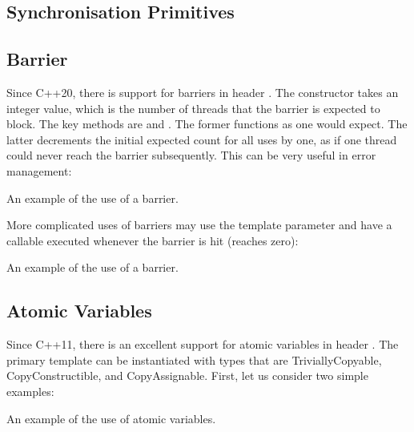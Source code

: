 \begin{itemize}
\begin{end}
\section{Synchronisation Primitives}

\subsection{Barrier}

Since C++20, there is support for barriers in header . The constructor takes an integer value, which is the number of threads that the barrier is expected to block. The key methods are  and . The former functions as one would expect. The latter decrements the initial expected count for all uses by one, as if one thread could never reach the barrier subsequently. This can be very useful in error management:

\raggedbottom
\begin{codebox}[]{\href{https://godbolt.org/z/}{\ExternalLink}}
\footnotesize An example of the use of a barrier.
\tcblower
{}
\end{codebox}

More complicated uses of barriers may use the template parameter  and have a callable executed whenever the barrier is hit (reaches zero):

\raggedbottom
\begin{codebox}[]{\href{https://godbolt.org/z/}{\ExternalLink}}
\footnotesize An example of the use of a barrier.
\tcblower
{}
\end{codebox}

\subsection{Atomic Variables}
\label{sec:atomiccpp23}

Since C++11, there is an excellent support for atomic variables in header . 
The primary template can be instantiated with types that are TriviallyCopyable, CopyConstructible, and CopyAssignable.
First, let us consider two simple examples:

\raggedbottom
\begin{codebox}[]{\href{https://godbolt.org/z/}{\ExternalLink}}
\footnotesize An example of the use of atomic variables.
\tcblower
{}
\end{codebox}


\end{end}
\end{itemize}
